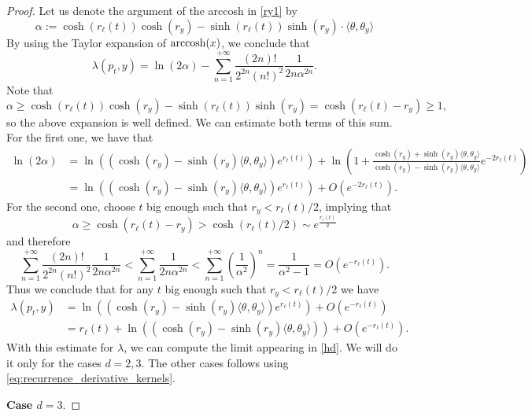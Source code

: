 \documentclass[12pt,longbibliography]{article}
\theoremstyle{definition}
\theoremstyle{remark}
\theoremstyle{example}
\begin{document}
\begin{proof}
	
	Let us denote the argument of the arccosh in \eqref{ry1} by
	\[
	\alpha:= \cosh (r_\ell(t)) \cosh (r_y)-\sinh (r_\ell(t)) \sinh (r_y) \cdot \langle\theta,\theta_y\rangle
	\]
	By using the Taylor expansion of $\textup{arccosh} (x)$, we conclude that 
	\[
	\lambda (p_t,y) = \ln (2\alpha )-\displaystyle\sum_{n=1}^{+\infty} \frac{(2n)!}{2^{2n} (n!)^2} \frac{1}{2n \alpha^{2n}}.
	\]
	Note that
	\[
	\alpha \geq \cosh (r_\ell(t)) \cosh (r_y)-\sinh (r_\ell(t)) \sinh (r_y) = \cosh(r_\ell(t)-r_y)\geq 1,
	\]
	so the above expansion is well defined. We can estimate both terms of this sum. For the first one, we have that
	\[
	\begin{split}
		\ln (2\alpha) &= \ln \left( (\cosh (r_y)-\sinh (r_y) \langle\theta,\theta_y\rangle) e^{r_\ell(t)} \right) + \ln \left( 1+ \frac{\cosh (r_y)+\sinh (r_y) \langle\theta,\theta_y\rangle}{\cosh (r_y)-\sinh (r_y) \langle\theta,\theta_y\rangle} e^{-2r_\ell(t)} \right) \\
		&= \ln \left( (\cosh (r_y)-\sinh (r_y) \langle\theta,\theta_y\rangle) e^{r_\ell(t)} \right) + O(e^{-2r_\ell(t)}).
	\end{split}
	\]
	For the second one, choose $t$ big enough such that $r_y<r_\ell(t)/2$, implying that
	\[
	\alpha\geq \cosh(r_\ell(t)-r_y)> \cosh(r_\ell(t)/2)\sim e^{\frac{r_\ell(t)}{2}}
	\]
	and therefore
	\[
	\displaystyle\sum_{n=1}^{+\infty}  \frac{(2n)!}{2^{2n} (n!)^2} \frac{1}{2n \alpha^{2n}} < \displaystyle\sum_{n=1}^{+\infty} \frac{1}{2n \alpha^{2n}} < \displaystyle\sum_{n=1}^{+\infty} \left(\frac{1}{\alpha^2}\right)^n = \frac{1}{\alpha^2-1} = O(e^{-r_\ell(t)}).
	\]
	Thus we conclude that for any $t$ big enough such that $r_y<r_\ell(t)/2$ we have 
	\begin{equation}\label{ry2}
		\begin{aligned}
			\lambda(p_t,y) &= \ln \left( (\cosh (r_y)-\sinh (r_y) \langle\theta,\theta_y\rangle) e^{r_\ell(t)} \right) + O(e^{-r_\ell(t)})\\[10pt]
			& =r_\ell(t) + \ln \left( (\cosh (r_y)-\sinh (r_y) \langle\theta,\theta_y\rangle)  \right) + O(e^{-r_\ell(t)}).
		\end{aligned}
	\end{equation}
	With this estimate for $\lambda$, we can compute the limit appearing in \eqref{hd}. We will do it only for the cases $d=2,3$. The other cases follows using \eqref{eq:recurrence_derivative_kernels}. 
	
	\noindent\textbf{Case $d=3$}.
	

\end{proof}
\end{document}
